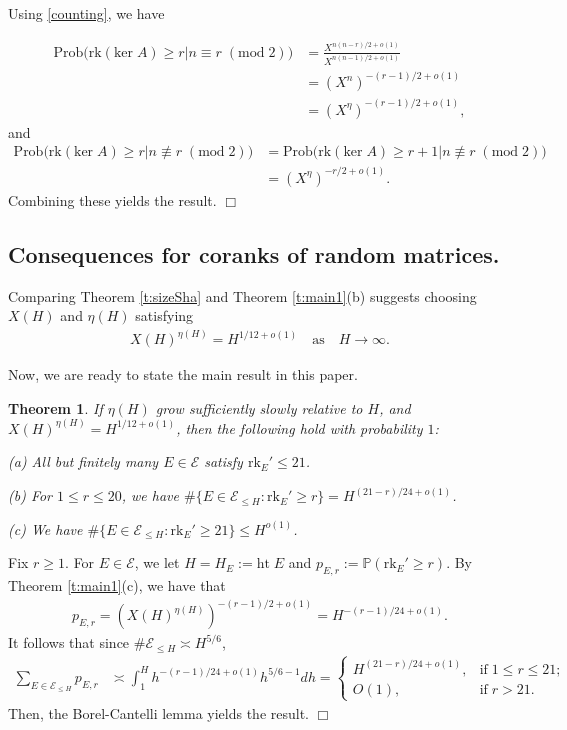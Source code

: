 \documentclass[12pt,reqno]{amsart}
\def\qed{{\hfill $\Box$ \bigskip}}
\newtheorem{thm}{Theorem}[section]
\numberwithin{equation}{section}
\def\qed{{\hfill $\Box$ \bigskip}}
\def\P{{\mathbb P}}
\def\sE{{\mathscr E}}
\begin{document}
Using \eqref{counting}, we have

\begin{align*}
\text{Prob}\big(\text{rk}(\text{ker} \; A) \ge r | n \equiv r \; (\text{mod} \; 2)\big) & = \frac{X^{n(n-r)/2+o(1)}}{X^{n(n-1)/2+o(1)}} \\
&= (X^n)^{-(r-1)/2+o(1)} \\
& = (X^\eta)^{-(r-1)/2+o(1)},
\end{align*}
and
\begin{align*}
\text{Prob}\big(\text{rk}(\text{ker} \; A) \ge r | n \not\equiv r \; (\text{mod} \; 2)\big) &= \text{Prob}\big(\text{rk}(\text{ker} \; A) \ge r+1 | n \not\equiv r \; (\text{mod} \; 2)\big) \\
& = (X^\eta)^{-r/2+o(1)}.
\end{align*}
Combining these yields the result.
\qed


\subsection{Consequences for coranks of random matrices.}
Comparing Theorem \ref{t:sizeSha} and Theorem \ref{t:main1}(b) suggests choosing $X(H)$ and $\eta(H)$ satisfying
\begin{align*}
X(H)^{\eta(H)} = H^{1/12+ o(1)} \quad \text{as} \quad H \to \infty.
\end{align*}

Now, we are ready to state the main result in this paper.

\begin{thm}
If $\eta(H)$ grow sufficiently slowly relative to $H$, and $X(H)^{\eta(H)} = H^{1/12+ o(1)}$, then the following hold with probability $1$:

\noindent(a) All but finitely many $E \in \sE$ satisfy $\text{rk}_E' \le 21$.

\noindent(b) For $1 \le r \le 20$, we have $\# \{E \in \sE_{\le H} : \text{rk}_E' \ge r\} = H^{(21-r)/24+o(1)}$.

\noindent(c) We have $\# \{E \in \sE_{\le H} : \text{rk}_E' \ge 21\} \le H^{o(1)}$.
\end{thm}
\proof
Fix $r \ge 1$. For $E \in \sE$, we let $H=H_E:= \text{ht} \; E$ and $p_{E,r} := \P(\text{rk}_E' \ge r)$. By Theorem \ref{t:main1}(c), we have that
\begin{align*}
p_{E,r} = (X(H)^{\eta(H)})^{-(r-1)/2 + o(1)} = H^{-(r-1)/24 + o(1)}.
\end{align*}
It follows that since $\#\sE_{\le H} \asymp H^{5/6}$, 
\begin{align*}
\sum_{E \in \sE_{\le H}} p_{E,r} & \asymp \int_1^H h^{-(r-1)/24 + o(1)} h^{5/6-1} dh=\begin{cases}
H^{(21-r)/24 + o(1)}, & \mbox{if} \; 1\le r\le 21;\\
O(1), & \mbox{if} \; r>21.
\end{cases}
\end{align*}
Then, the Borel-Cantelli lemma yields the result.
\qed
\end{document}

